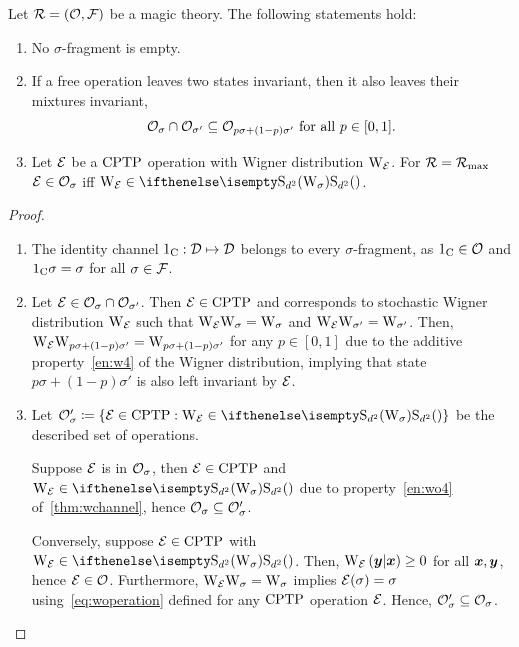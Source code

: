 \begin{theorem}\label{thm:frag}
    Let $\mathcal{R} = (\mathcal{O}, \mathcal{F})$ be a magic theory. 
    The following statements hold:
    \begin{enumerate}
        \item No $\sigma$-fragment is empty.
        \item If a free operation leaves two states invariant, then it also leaves their mixtures invariant, 
        \begin{equation}
            \mathcal{O}_{\sigma} \cap \mathcal{O}_{\sigma'} \subseteq \mathcal{O}_{p\sigma + (1-p)\sigma'}\ \text{for all}\ p \in [0,1].
        \end{equation}
        \item Let $\mathcal{E}$ be a ${\rm{CPTP}}$ operation with Wigner distribution $\W{\E}$.
        For $\mathcal{R} = \mathcal{R}_{\rm{}max}$ $\mathcal{E} \in \mathcal{O}_\sigma$ iff $\W{\E} \in \stochw$.
    \end{enumerate}
\end{theorem}
\begin{proof}$ $\\

    \begin{enumerate}
    \item The identity channel $1_{\rm{C}}: \mathcal{D} \mapsto \mathcal{D}$ belongs to every $\sigma$-fragment, as $1_{\rm{C}} \in \mathcal{O}$ and $1_{\rm{C}}\sigma = \sigma$ for all $\sigma \in \mathcal{F}$.
    
    \item Let $\mathcal{E} \in \mathcal{O}_{\sigma} \cap \mathcal{O}_{\sigma'}$.
    Then $\mathcal{E} \in {\rm{CPTP}}$ and corresponds to stochastic Wigner distribution $\W{\E}$ such that $\W{\E} \W{\sigma} = \W{\sigma}$ and $\W{\E} \W{\sigma'} = \W{\sigma'}$.
    Then, $\W{\E} \W{p\sigma + (1-p)\sigma'} = \W{p\sigma + (1-p)\sigma'}$ for any $p \in [0,1]$ due to the additive property~\ref{en:w4} of the Wigner distribution, implying that state $p\sigma + (1-p)\sigma'$ is also left invariant by $\mathcal{E}$.
    
    \item Let $\O_\sigma' \coloneqq \{ \E \in \cptp: \W{\E} \in \stochw \}$ be the described set of operations.
    
    Suppose $\mathcal{E}$ is in $\mathcal{O}_\sigma$, then $\mathcal{E} \in {\rm{CPTP}}$ and $\W{\E} \in \stochw$ due to property~\ref{en:wo4} of~\cref{thm:wchannel}, hence $\mathcal{O}_\sigma \subseteq \mathcal{O}_\sigma'$.
    
    Conversely, suppose $\mathcal{E} \in {\rm{CPTP}}$ with $\W{\E} \in \stochw$. 
    Then, $\W[\bmy|\bmx]{\E} \geq 0$ for all $\bm{x}, \bm{y}$, hence $\mathcal{E} \in \mathcal{O}$.
    Furthermore, $\W{\E} \W{\sigma} = \W{\sigma}$ implies $\mathcal{E}(\sigma) = \sigma$ using~\cref{eq:woperation} defined for any ${\rm{CPTP}}$ operation $\mathcal{E}$.
    Hence, $\mathcal{O}_\sigma' \subseteq \mathcal{O}_\sigma$.
    \end{enumerate}
\end{proof}

